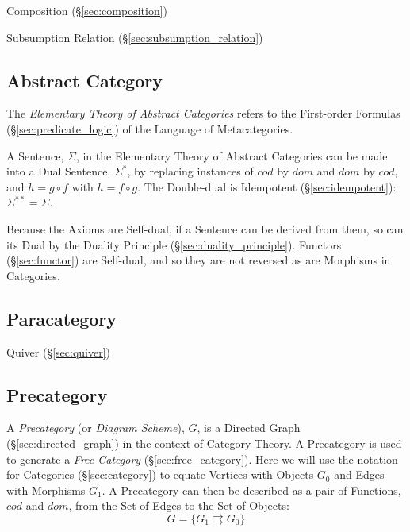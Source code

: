 Composition (\S\ref{sec:composition})

Subsumption Relation (\S\ref{sec:subsumption_relation})



\subsection{Abstract Category}\label{sec:abstract_category}

The \emph{Elementary Theory of Abstract Categories} refers to the
First-order Formulas (\S\ref{sec:predicate_logic}) of the Language
of Metacategories.

A Sentence, $\Sigma$, in the Elementary Theory of Abstract Categories
can be made into a Dual Sentence, $\Sigma^*$, by replacing instances
of $cod$ by $dom$ and $dom$ by $cod$, and $h = g \circ f$ with $h = f
\circ g$. The Double-dual is Idempotent (\S\ref{sec:idempotent}):
$\Sigma^{**} = \Sigma$.

Because the Axioms are Self-dual, if a Sentence can be derived from
them, so can its Dual by the Duality Principle
(\S\ref{sec:duality_principle}). Functors (\S\ref{sec:functor}) are
Self-dual, and so they are not reversed as are Morphisms in
Categories.



\subsection{Paracategory}\label{sec:paracategory}

Quiver (\S\ref{sec:quiver})



\subsection{Precategory}\label{sec:precategory}

A \emph{Precategory} (or \emph{Diagram Scheme}), $G$, is a Directed Graph
(\S\ref{sec:directed_graph}) in the context of Category Theory. A Precategory is
used to generate a \emph{Free Category} (\S\ref{sec:free_category}). Here we
will use the notation for Categories (\S\ref{sec:category}) to equate Vertices
with Objects $G_0$ and Edges with Morphisms $G_1$. A Precategory can then be
described as a pair of Functions, $cod$ and $dom$, from the Set of Edges to the
Set of Objects:
\[
  G = \{G_1 \rightrightarrows G_0\}
\]

